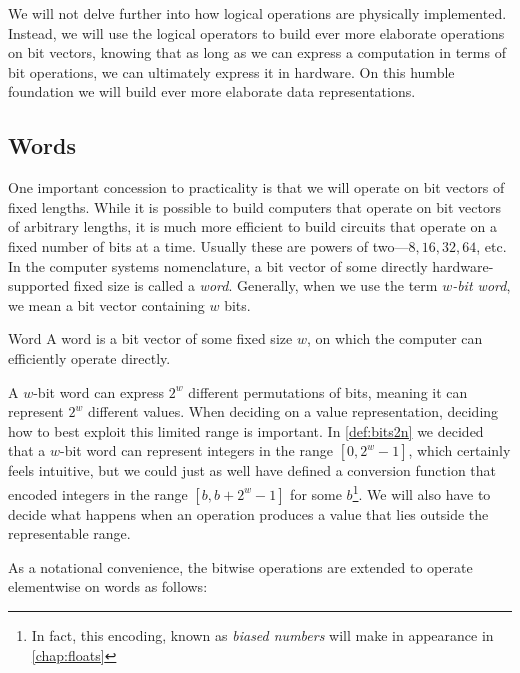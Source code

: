 We will not delve further into how logical operations are physically
implemented.  Instead, we will use the logical operators to build ever
more elaborate operations on bit vectors, knowing that as long as we
can express a computation in terms of bit operations, we can
ultimately express it in hardware.  On this humble foundation we will
build ever more elaborate data representations.

\subsection{Words}
\label{sec:words}

One important concession to practicality is that we will operate on
bit vectors of fixed lengths.  While it is possible to build computers
that operate on bit vectors of arbitrary lengths, it is much more
efficient to build circuits that operate on a fixed number of bits at
a time.  Usually these are powers of two---$8,16,32,64$, etc.  In the
computer systems nomenclature, a bit vector of some directly
hardware-supported fixed size is called a \emph{word}.  Generally,
when we use the term \emph{$w$-bit word}, we mean a bit vector
containing $w$ bits.

\begin{definition}{Word}
  A word is a bit vector of some fixed size $w$, on which the computer
  can efficiently operate directly.
\end{definition}

A $w$-bit word can express $2^{w}$ different permutations of bits,
meaning it can represent $2^{w}$ different values.  When deciding on a
value representation, deciding how to best exploit this limited range
is important.  In \cref{def:bits2n} we decided that a $w$-bit word can
represent integers in the range $[0,2^{w}-1]$, which certainly feels
intuitive, but we could just as well have defined a conversion
function that encoded integers in the range $[b,b+2^{w}-1]$ for some
$b$\footnote{In fact, this encoding, known as \emph{biased numbers}
  will make in appearance in \cref{chap:floats}}.  We will also have
to decide what happens when an operation produces a value that lies
outside the representable range.

As a notational convenience, the bitwise operations are extended to
operate elementwise on words as follows:

